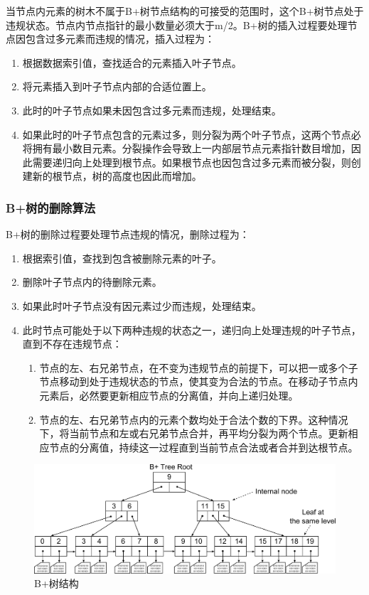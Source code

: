 当节点内元素的树木不属于B+树节点结构的可接受的范围时，这个B+树节点处于违规状态。节点内节点指针的最小数量必须大于m/2。B+树的插入过程要处理节点因包含过多元素而违规的情况，插入过程为：
\begin{enumerate}
\item 根据数据索引值，查找适合的元素插入叶子节点。
\item 将元素插入到叶子节点内部的合适位置上。
\item 此时的叶子节点如果未因包含过多元素而违规，处理结束。
\item 如果此时的叶子节点包含的元素过多，则分裂为两个叶子节点，这两个节点必将拥有最小数目元素。分裂操作会导致上一内部层节点元素指针数目增加，因此需要递归向上处理到根节点。如果根节点也因包含过多元素而被分裂，则创建新的根节点，树的高度也因此而增加。
\end{enumerate}

\subsubsection{B+树的删除算法}

B+树的删除过程要处理节点违规的情况，删除过程为：

\begin{enumerate}
\item 根据索引值，查找到包含被删除元素的叶子。
\item 删除叶子节点内的待删除元素。
\item 如果此时叶子节点没有因元素过少而违规，处理结束。
\item 此时节点可能处于以下两种违规的状态之一，递归向上处理违规的叶子节点，直到不存在违规节点：
\begin{enumerate}
\item 节点的左、右兄弟节点，在不变为违规节点的前提下，可以把一或多个子节点移动到处于违规状态的节点，使其变为合法的节点。在移动子节点内元素后，必然要更新相应节点的分离值，并向上递归处理。
\item 节点的左、右兄弟节点内的元素个数均处于合法个数的下界。这种情况下，将当前节点和左或右兄弟节点合并，再平均分裂为两个节点。更新相应节点的分离值，持续这一过程直到当前节点合法或者合并到达根节点。
\end{enumerate}
\end{enumerate}

\begin{figure}[H]
\centering
\includegraphics[width=1\linewidth]{./graph/bplus-tree}
\caption{B+树结构}
\label{fig:bplus-tree}
\end{figure}


